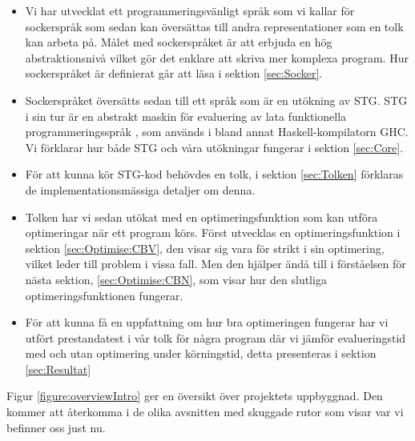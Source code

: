 \documentclass[Rapport]{subfiles}
\begin{document}
\begin{itemize}
    \item Vi har utvecklat ett programmeringsvänligt språk som vi kallar för sockerspråk
          som sedan kan översättas till andra representationer som en tolk kan arbeta på. Målet med sockerspråket är att erbjuda en hög abstraktionsnivå vilket gör det enklare att skriva mer komplexa program.
Hur sockerspråket är definierat
          går att läsa i sektion \ref{sec:Socker}.
          
    \item Sockerspråket översätts sedan till ett språk som är en utökning 
          av STG. STG i sin tur är en abstrakt maskin för evaluering av
          lata funktionella programmeringsspråk \cite{stg}, som används i bland annat
          Haskell-kompilatorn GHC. Vi förklarar hur både STG och våra utökningar
          fungerar i sektion \ref{sec:Core}.
    
    \item För att kunna kör STG-kod behövdes en tolk, i sektion \ref{sec:Tolken} förklaras de implementationsmässiga detaljer om denna.
    
    \item Tolken har vi sedan utökat med en optimeringsfunktion som kan utföra optimeringar
          när ett program körs. Först utvecklas en optimeringsfunktion i sektion 
          \ref{sec:Optimise:CBV}, den visar sig vara för strikt i sin optimering,
          vilket leder till problem i vissa fall. Men den hjälper ändå till
          i förståelsen för nästa sektion, \ref{sec:Optimise:CBN}, som visar hur
          den slutliga optimeringsfunktionen fungerar.
    
    \item För att kunna få en uppfattning om hur bra optimeringen fungerar har
          vi utfört prestandatest i vår tolk för några program där vi jämför
          evalueringstid med och utan optimering under körningstid, 
          detta presenteras i sektion \ref{sec:Resultat}
    
\end{itemize}

Figur \ref{figure:overviewIntro} ger en översikt över projektets uppbyggnad. Den kommer
att återkomma i de olika avsnitten med skuggade rutor som visar var
vi befinner oss just nu.

\overviewIntro
\end{document}
